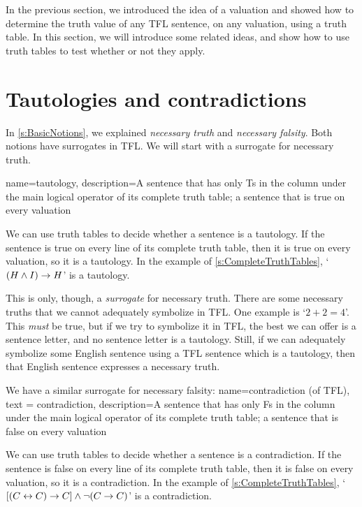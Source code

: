 In the previous section, we introduced the idea of a valuation and showed how to determine the truth value of any TFL sentence, on any valuation, using a truth table. In this section, we will introduce some related ideas, and show how to use truth tables to test whether or not they apply.


\section{Tautologies and contradictions}
In \cref{s:BasicNotions}, we explained \emph{necessary truth} and \emph{necessary falsity}. Both notions have surrogates in TFL. We will start with a surrogate for necessary truth.

{
name=tautology,
description={A sentence that has only Ts in the column under the main logical operator of its \gls{complete truth table}; a sentence that is true on every \gls{valuation}}
}

We can use truth tables to decide whether a sentence is a tautology. If the sentence is true on every line of its complete truth table, then it is true on every valuation, so it is a tautology. In the example of \cref{s:CompleteTruthTables}, `$(H \wedge I) \rightarrow H$' is a tautology.

This is only, though, a \emph{surrogate} for necessary truth. There are some necessary truths that we cannot adequately symbolize in TFL. One example is `$2 + 2 = 4$'. This \emph{must} be true, but if we try to symbolize it in TFL, the best we can offer is a sentence letter, and no sentence letter is a tautology. Still, if we can adequately symbolize some English sentence using a TFL sentence which is a tautology, then that English sentence expresses a necessary truth.

We have a similar surrogate for necessary falsity:
{
  name=contradiction (of TFL),
  text = contradiction,
description={A sentence that has only Fs in the column under the main logical operator of its \gls{complete truth table}; a sentence that is false on every \gls{valuation}}
}

We can use truth tables to decide whether a sentence is a contradiction. If the sentence is false on every line of its complete truth table, then it is false on every valuation, so it is a contradiction. In the example of \cref{s:CompleteTruthTables}, `$[(C\leftrightarrow C) \rightarrow C] \wedge \neg(C \rightarrow C)$' is a contradiction.

